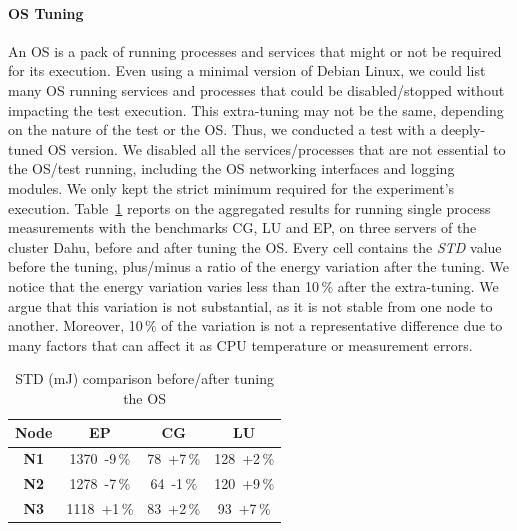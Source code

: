 \paragraph{OS Tuning}
An OS is a pack of running processes and services that might or not be required for its execution.
Even using a minimal version of Debian Linux, we could list many OS running services and processes that could be disabled/stopped without impacting the test execution.
This extra-tuning may not be the same, depending on the nature of the test or the OS.
Thus, we conducted a test with a deeply-tuned OS version.
We disabled all the services/processes that are not essential to the OS/test running, including the OS networking interfaces and logging modules. We only kept the strict minimum required for the experiment's execution.
Table~\ref{table:osmin} reports on the aggregated results for running single process measurements with the benchmarks \textsf{CG}, \textsf{LU} and \textsf{EP}, on three servers of the cluster \textsf{Dahu}, before and after tuning the OS.
Every cell contains the \emph{STD} value before the tuning, plus/minus a ratio of the energy variation after the tuning.
We notice that the energy variation varies less than 10\,\% after the extra-tuning.
We argue that this variation is not substantial, as it is not stable from one node to another.
Moreover, 10\,\% of the variation is not a representative difference due to many factors that can affect it as CPU temperature or measurement errors.

\begin{table}
    \centering
    \caption{STD (mJ) comparison before/after tuning the OS}
    \label{table:osmin}
    \small
    \begin{tabular}{|c|c|c|c|}
        \hline
        \textbf{Node} & \textbf{\sf EP} & \textbf{\sf CG} & \textbf{\sf LU} \\
        \hline
        \hline
        \textbf{N1}   & 1370~-9\,\%     & 78~+7\,\%       & 128~+2\,\%      \\
        \hline
        \textbf{N2}   & 1278~-7\,\%     & 64~-1\,\%       & 120~+9\,\%      \\
        \hline
        \textbf{N3}   & 1118~+1\,\%     & 83~+2\,\%       & 93~+7\,\%       \\
        \hline
    \end{tabular}
\end{table}

